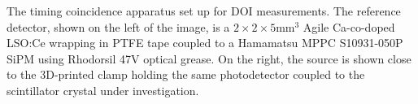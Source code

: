 \label{fig:actualsetup} The timing coincidence apparatus set up for DOI measurements. The reference detector, shown on the left of the image, is a $2\times2\times5$mm$^3$ Agile Ca-co-doped LSO:Ce wrapping in PTFE tape coupled to a Hamamatsu MPPC S10931-050P SiPM using Rhodorsil 47V optical grease. On the right, the source is shown close to the 3D-printed clamp holding the same photodetector coupled to the scintillator crystal under investigation.